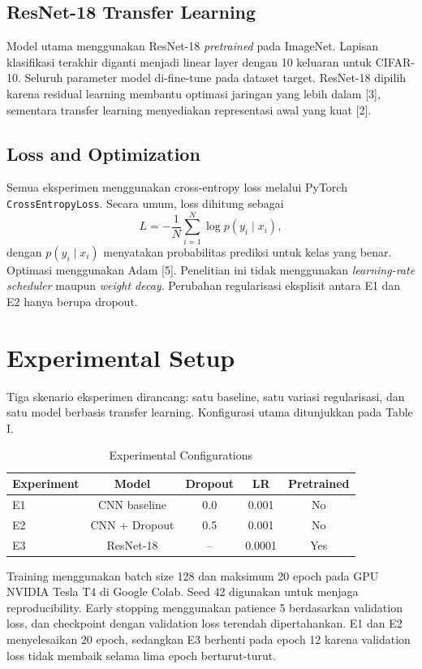 \documentclass[conference,a4paper]{IEEEtran}
\begin{document}
\subsection{ResNet-18 Transfer Learning}
Model utama menggunakan ResNet-18 \textit{pretrained} pada ImageNet. Lapisan klasifikasi terakhir diganti menjadi linear layer dengan 10 keluaran untuk CIFAR-10. Seluruh parameter model di-fine-tune pada dataset target. ResNet-18 dipilih karena residual learning membantu optimasi jaringan yang lebih dalam [3], sementara transfer learning menyediakan representasi awal yang kuat [2].

\subsection{Loss and Optimization}
Semua eksperimen menggunakan cross-entropy loss melalui PyTorch \texttt{CrossEntropyLoss}. Secara umum, loss dihitung sebagai
\begin{equation}
L=-\frac{1}{N}\sum_{i=1}^{N}\log p(y_i\mid x_i),
\end{equation}
dengan $p(y_i\mid x_i)$ menyatakan probabilitas prediksi untuk kelas yang benar. Optimasi menggunakan Adam [5]. Penelitian ini tidak menggunakan \textit{learning-rate scheduler} maupun \textit{weight decay}. Perubahan regularisasi eksplisit antara E1 dan E2 hanya berupa dropout.

\section{Experimental Setup}
Tiga skenario eksperimen dirancang: satu baseline, satu variasi regularisasi, dan satu model berbasis transfer learning. Konfigurasi utama ditunjukkan pada Table I.

\begin{table}[htbp]
\caption{Experimental Configurations}
\centering
\begin{tabular}{lcccc}
\toprule
Experiment & Model & Dropout & LR & Pretrained \\
\midrule
E1 & CNN baseline & 0.0 & 0.001 & No \\
E2 & CNN + Dropout & 0.5 & 0.001 & No \\
E3 & ResNet-18 & -- & 0.0001 & Yes \\
\bottomrule
\end{tabular}
\label{tab:exp}
\end{table}

Training menggunakan batch size 128 dan maksimum 20 epoch pada GPU NVIDIA Tesla T4 di Google Colab. Seed 42 digunakan untuk menjaga reproducibility. Early stopping menggunakan patience 5 berdasarkan validation loss, dan checkpoint dengan validation loss terendah dipertahankan. E1 dan E2 menyelesaikan 20 epoch, sedangkan E3 berhenti pada epoch 12 karena validation loss tidak membaik selama lima epoch berturut-turut.
\end{document}
